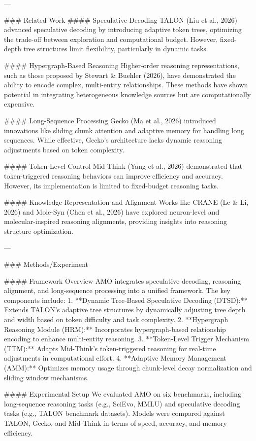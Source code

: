 ---

### Related Work  
#### Speculative Decoding  
TALON (Liu et al., 2026) advanced speculative decoding by introducing adaptive token trees, optimizing the trade-off between exploration and computational budget. However, fixed-depth tree structures limit flexibility, particularly in dynamic tasks.

#### Hypergraph-Based Reasoning  
Higher-order reasoning representations, such as those proposed by Stewart & Buehler (2026), have demonstrated the ability to encode complex, multi-entity relationships. These methods have shown potential in integrating heterogeneous knowledge sources but are computationally expensive.

#### Long-Sequence Processing  
Gecko (Ma et al., 2026) introduced innovations like sliding chunk attention and adaptive memory for handling long sequences. While effective, Gecko's architecture lacks dynamic reasoning adjustments based on token complexity.

#### Token-Level Control  
Mid-Think (Yang et al., 2026) demonstrated that token-triggered reasoning behaviors can improve efficiency and accuracy. However, its implementation is limited to fixed-budget reasoning tasks.

#### Knowledge Representation and Alignment  
Works like CRANE (Le & Li, 2026) and Mole-Syn (Chen et al., 2026) have explored neuron-level and molecular-inspired reasoning alignments, providing insights into reasoning structure optimization.

---

### Methods/Experiment  

#### Framework Overview  
AMO integrates speculative decoding, reasoning alignment, and long-sequence processing into a unified framework. The key components include:
1. **Dynamic Tree-Based Speculative Decoding (DTSD):** Extends TALON's adaptive tree structures by dynamically adjusting tree depth and width based on token difficulty and task complexity.
2. **Hypergraph Reasoning Module (HRM):** Incorporates hypergraph-based relationship encoding to enhance multi-entity reasoning.
3. **Token-Level Trigger Mechanism (TTM):** Adapts Mid-Think’s token-triggered reasoning for real-time adjustments in computational effort.
4. **Adaptive Memory Management (AMM):** Optimizes memory usage through chunk-level decay normalization and sliding window mechanisms.

#### Experimental Setup  
We evaluated AMO on six benchmarks, including long-sequence reasoning tasks (e.g., SciEvo, MMLU) and speculative decoding tasks (e.g., TALON benchmark datasets). Models were compared against TALON, Gecko, and Mid-Think in terms of speed, accuracy, and memory efficiency.

